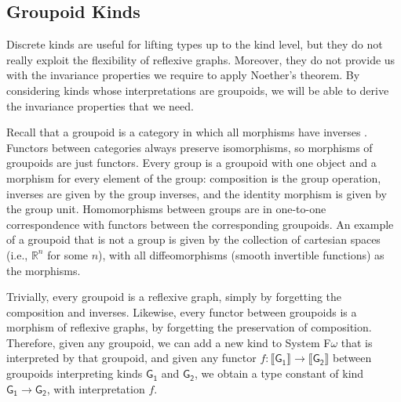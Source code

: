 \documentclass[preprint]{sigplanconf}
\theoremstyle{examplestyle}
\newcommand{\sem}[1]{\llbracket #1 \rrbracket}
\begin{document}
\subsection{Groupoid Kinds}
\label{sec:groupoid-kinds}

Discrete kinds are useful for lifting types up to the kind level, but
they do not really exploit the flexibility of reflexive
graphs. Moreover, they do not provide us with the invariance
properties we require to apply Noether's theorem. By considering kinds
whose interpretations are groupoids, we will be able to derive the
invariance properties that we need.

Recall that a groupoid is a category in which all morphisms have
inverses \cite{maclane98categories}. Functors between categories
always preserve isomorphisms, so morphisms of groupoids are just
functors. Every group is a groupoid with one object and a morphism for
every element of the group: composition is the group operation,
inverses are given by the group inverses, and the identity morphism is
given by the group unit. Homomorphisms between groups are in
one-to-one correspondence with functors between the corresponding
groupoids. An example of a groupoid that is not a group is given by
the collection of cartesian spaces (i.e., $\mathbb{R}^n$ for some
$n$), with all diffeomorphisms (smooth invertible functions) as the
morphisms.

Trivially, every groupoid is a reflexive graph, simply by forgetting
the composition and inverses. Likewise, every functor between
groupoids is a morphism of reflexive graphs, by forgetting the
preservation of composition. Therefore, given any groupoid, we can add
a new kind to System F$\omega$ that is interpreted by that groupoid,
and given any functor $f : \sem{\mathsf{G_1}} \to \sem{\mathsf{G_2}}$
between groupoids interpreting kinds $\mathsf{G_1}$ and
$\mathsf{G_2}$, we obtain a type constant of kind $\mathsf{G_1} \to
\mathsf{G_2}$, with interpretation $f$.
\end{document}

